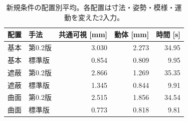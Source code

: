 \begin{table}[H]\centering
\small
\setlength{\tabcolsep}{4pt}
\caption{新規条件の配置別平均。各配置は寸法・姿勢・模様・運動を変えた2入力。}
\begin{tabular}{llrrr}
\toprule
配置 & 手法 & 共通可視 [mm] & 動体 [mm] & 時間 [s]\\\midrule
基本 & 第0.2版 & 3.030 & 2.273 & 34.95\\
基本 & 標準版 & 0.854 & 0.809 & 9.95\\
遮蔽 & 第0.2版 & 2.866 & 1.269 & 35.35\\
遮蔽 & 標準版 & 1.345 & 0.844 & 9.91\\
曲面 & 第0.2版 & 2.515 & 1.856 & 34.54\\
曲面 & 標準版 & 0.773 & 0.818 & 9.81\\
\bottomrule
\end{tabular}
\end{table}

